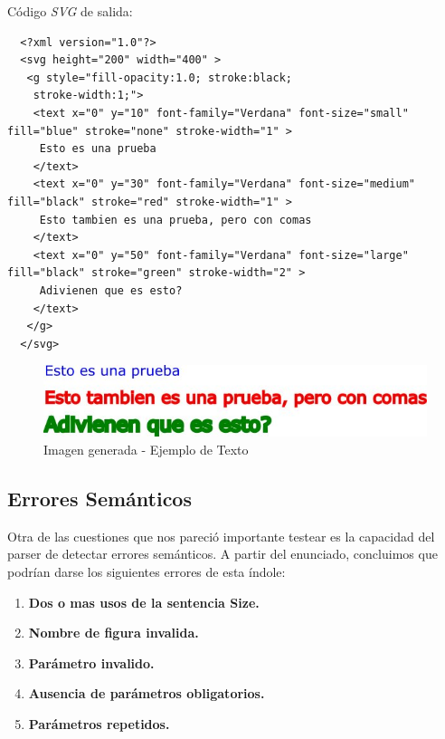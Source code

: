 Código \textit{SVG} de salida:

\begin{lstlisting}
  <?xml version="1.0"?>
  <svg height="200" width="400" >
   <g style="fill-opacity:1.0; stroke:black;
    stroke-width:1;">
    <text x="0" y="10" font-family="Verdana" font-size="small" fill="blue" stroke="none" stroke-width="1" >
     Esto es una prueba
    </text>
    <text x="0" y="30" font-family="Verdana" font-size="medium" fill="black" stroke="red" stroke-width="1" >
     Esto tambien es una prueba, pero con comas
    </text>
    <text x="0" y="50" font-family="Verdana" font-size="large" fill="black" stroke="green" stroke-width="2" >
     Adivienen que es esto?
    </text>
   </g>
  </svg>\end{lstlisting}


\begin{figure}[H]
\centering
\includegraphics[width=150mm]{imagenes/text.jpg}
\caption{Imagen generada - Ejemplo de Texto}
\end{figure}


\newpage

\subsection{Errores Semánticos}
Otra de las cuestiones que nos pareció importante testear es la capacidad del parser de detectar errores semánticos. A partir del enunciado, concluimos que podrían darse los siguientes errores de esta índole:
\begin{enumerate}
  \item \textbf{Dos o mas usos de la sentencia Size.}
  \item \textbf{Nombre de figura invalida.}
  \item \textbf{Parámetro invalido.}
  \item \textbf{Ausencia de parámetros obligatorios.}
  \item \textbf{Parámetros repetidos.}
\end{enumerate}

